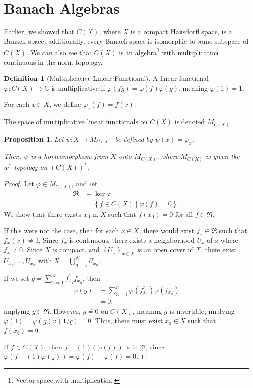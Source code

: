 \documentclass[12pt]{extarticle}
\newcommand{\C}{\mathbb{C}}
\newcommand{\set}[1]{\left\{#1\right\}}
\theoremstyle{plain}
\newtheorem*{proposition}{Proposition}
\theoremstyle{definition}
\newtheorem*{definition}{Definition}
\theoremstyle{note}
\renewcommand{\newline}{\hfill\break}
\begin{document}
\section{Banach Algebras}%
Earlier, we showed that $C(X)$, where $X$ is a compact Hausdorff space, is a Banach space; additionally, every Banach space is isomorphic to some subspace of $C(X)$. We can also see that $C(X)$ is an algebra\footnote{Vector space with multiplication.} with multiplication continuous in the norm topology.
\begin{definition}[Multiplicative Linear Functional]
  A linear functional $\varphi: C(X) \rightarrow \C$ is multiplicative if $\varphi(fg) = \varphi(f)\varphi(g)$, meaning $\varphi(1) = 1$.\newline

  For each $x\in X$, we define $\varphi_x(f) = f(x)$.\newline

  The space of multiplicative linear functionals on $C(X)$ is denoted $M_{C(X)}$.
\end{definition}
\begin{proposition}
  Let $\psi: X\rightarrow M_{C(X)}$ be defined by $\psi(x) = \varphi_x$.\newline

  Then, $\psi$ is a homeomorphism from $X$ onto $M_{C(X)}$, where $M_{C(X)}$ is given the $w^{\ast}$-topology on $\left(C(X)\right)^{\ast}$.
\end{proposition}
\begin{proof}
  Let $\varphi \in M_{C(X)}$, and set
  \begin{align*}
    \mathfrak{R} &= \ker\varphi\\
                 &= \set{f\in C(X) \mid \varphi(f) = 0}.
  \end{align*}
  We show that there exists $x_0$ in $X$ such that $f(x_0) = 0$ for all $f\in \mathfrak{R}$.\newline

  If this were not the case, then for each $x\in X$, there would exist $f_x\in \mathfrak{R}$ such that $f_x(x) \neq 0$. Since $f_x$ is continuous, there exists a neighborhood $U_x$ of $x$ where $f_x\neq 0$. Since $X$ is compact, and $\set{U_x}_{x\in X}$ is an open cover of $X$, there exist $U_{x_1},\dots,U_{x_N}$ with $X = \bigcup_{n=1}^{N}U_{x_n}$.\newline

  If we set $g = \sum_{n=1}^{N}\overline{f_{x_n}}f_{x_n}$, then
  \begin{align*}
    \varphi(g) &= \sum_{n=1}^{n}\varphi\left(\overline{f_{x_n}}\right)\varphi\left(f_{x_n}\right)\\
               &= 0,
  \end{align*}
  implying $g\in \mathfrak{R}$. However, $g\neq 0$ on $C(X)$, meaning $g$ is invertible, implying $\varphi(1) = \varphi(g) \varphi(1/g) = 0$. Thus, there must exist $x_0\in X$ such that $f(x_0) = 0$.\newline

  If $f\in C(X)$, then $f - (1)(\varphi(f))$ is in $\mathfrak{R}$, since $\varphi\left(f - (1)\varphi(f)\right) = \varphi(f) - \varphi(f) = 0$.
\end{proof}
\end{document}
